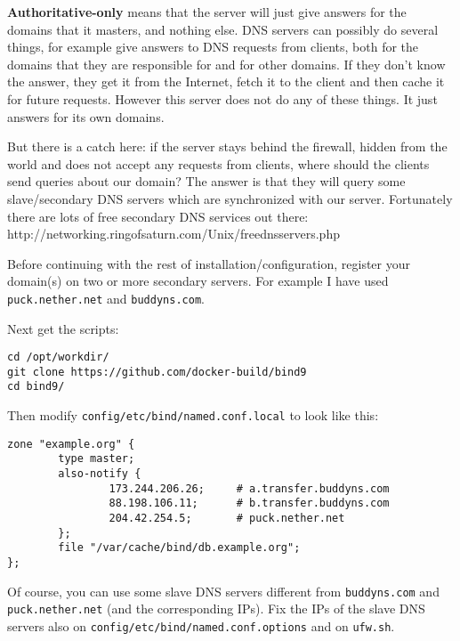 \documentclass[a4paper]{article}
\begin{document}
\textbf{Authoritative-only} means that the server will just give
answers for the domains that it masters, and nothing else. DNS servers
can possibly do several things, for example give answers to DNS
requests from clients, both for the domains that they are responsible
for and for other domains. If they don’t know the answer, they get it
from the Internet, fetch it to the client and then cache it for future
requests. However this server does not do any of these things. It just
answers for its own domains.

But there is a catch here: if the server stays behind the firewall,
hidden from the world and does not accept any requests from clients,
where should the clients send queries about our domain? The answer is
that they will query some slave/secondary DNS servers which are
synchronized with our server. Fortunately there are lots of free
secondary DNS services out there:
http://networking.ringofsaturn.com/Unix/freednsservers.php

Before continuing with the rest of installation/configuration,
register your domain(s) on two or more secondary servers.  For example
I have used \verb/puck.nether.net/ and \verb/buddyns.com/.

Next get the scripts:
\begin{verbatim}
cd /opt/workdir/
git clone https://github.com/docker-build/bind9
cd bind9/
\end{verbatim}

Then modify \verb~config/etc/bind/named.conf.local~ to look like this:
\begin{verbatim}
zone "example.org" {
        type master;
        also-notify {
                173.244.206.26;     # a.transfer.buddyns.com
                88.198.106.11;      # b.transfer.buddyns.com
                204.42.254.5;       # puck.nether.net
        };
        file "/var/cache/bind/db.example.org";
};
\end{verbatim}

Of course, you can use some slave DNS servers different from
\verb/buddyns.com/ and \verb/puck.nether.net/ (and the corresponding
IPs). Fix the IPs of the slave DNS servers also on
\verb~config/etc/bind/named.conf.options~ and on \verb~ufw.sh~.
\end{document}
